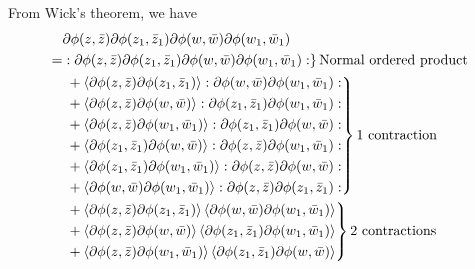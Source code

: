 \documentclass[10pt]{article}
\begin{document}
From Wick's theorem, we have
\begin{equation}\label{eq:app:OPE:boson:TT:wick_1}
    \begin{aligned}
          & \partial\phi(z,\bar{z})\partial\phi(z_1,\bar{z}_1)\partial\phi(w,\bar{w})\partial\phi(w_1,\bar{w}_1)                                                           \\
        = & \left.:\partial\phi(z,\bar{z})\partial\phi(z_1,\bar{z}_1)\partial\phi(w,\bar{w})\partial\phi(w_1,\bar{w}_1):\right\rbrace\text{Normal ordered product}         \\
          & \left.\begin{aligned}
                       & +\expval{\partial\phi(z,\bar{z})\partial\phi(z_1,\bar{z}_1)}:\partial\phi(w,\bar{w})\partial\phi(w_1,\bar{w}_1): \\
                       & +\expval{\partial\phi(z,\bar{z})\partial\phi(w,\bar{w})}:\partial\phi(z_1,\bar{z}_1)\partial\phi(w_1,\bar{w}_1): \\
                       & +\expval{\partial\phi(z,\bar{z})\partial\phi(w_1,\bar{w}_1)}:\partial\phi(z_1,\bar{z}_1)\partial\phi(w,\bar{w}): \\
                       & +\expval{\partial\phi(z_1,\bar{z}_1)\partial\phi(w,\bar{w})}:\partial\phi(z,\bar{z})\partial\phi(w_1,\bar{w}_1): \\
                       & +\expval{\partial\phi(z_1,\bar{z}_1)\partial\phi(w_1,\bar{w}_1)}:\partial\phi(z,\bar{z})\partial\phi(w,\bar{w}): \\
                       & +\expval{\partial\phi(w,\bar{w})\partial\phi(w_1,\bar{w}_1)}:\partial\phi(z,\bar{z})\partial\phi(z_1,\bar{z}_1):
                  \end{aligned}\right\rbrace\text{1 contraction}                  \\
          & \left.\begin{aligned}
                       & +\expval{\partial\phi(z,\bar{z})\partial\phi(z_1,\bar{z}_1)}\expval{\partial\phi(w,\bar{w})\partial\phi(w_1,\bar{w}_1)} \\
                       & +\expval{\partial\phi(z,\bar{z})\partial\phi(w,\bar{w})}\expval{\partial\phi(z_1,\bar{z}_1)\partial\phi(w_1,\bar{w}_1)} \\
                       & +\expval{\partial\phi(z,\bar{z})\partial\phi(w_1,\bar{w}_1)}\expval{\partial\phi(z_1,\bar{z}_1)\partial\phi(w,\bar{w})}
                  \end{aligned}\right\rbrace\text{2 contractions}
    \end{aligned}
\end{equation}
\end{document}
